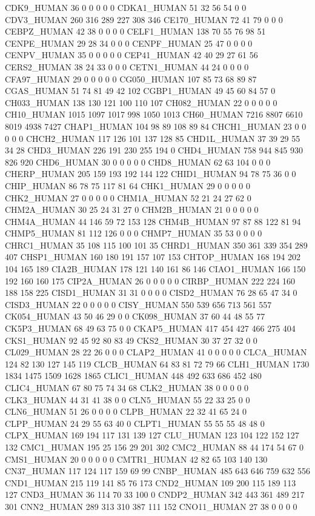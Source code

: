 CDK9_HUMAN	36	0	0	0	0	0
CDKA1_HUMAN	51	32	56	54	0	0
CDV3_HUMAN	260	316	289	227	308	346
CE170_HUMAN	72	41	79	0	0	0
CEBPZ_HUMAN	42	38	0	0	0	0
CELF1_HUMAN	138	70	55	76	98	51
CENPE_HUMAN	29	28	34	0	0	0
CENPF_HUMAN	25	47	0	0	0	0
CENPV_HUMAN	35	0	0	0	0	0
CEP41_HUMAN	42	40	29	27	61	56
CERS2_HUMAN	38	24	33	0	0	0
CETN1_HUMAN	44	24	0	0	0	0
CFA97_HUMAN	29	0	0	0	0	0
CG050_HUMAN	107	85	73	68	89	87
CGAS_HUMAN	51	74	81	49	42	102
CGBP1_HUMAN	49	45	60	84	57	0
CH033_HUMAN	138	130	121	100	110	107
CH082_HUMAN	22	0	0	0	0	0
CH10_HUMAN	1015	1097	1017	998	1050	1013
CH60_HUMAN	7216	8807	6610	8019	4938	7427
CHAP1_HUMAN	104	98	89	108	89	84
CHCH1_HUMAN	23	0	0	0	0	0
CHCH2_HUMAN	117	126	101	137	128	85
CHD1L_HUMAN	37	39	29	55	34	28
CHD3_HUMAN	226	191	230	255	194	0
CHD4_HUMAN	758	944	845	930	826	920
CHD6_HUMAN	30	0	0	0	0	0
CHD8_HUMAN	62	63	104	0	0	0
CHERP_HUMAN	205	159	193	192	144	122
CHID1_HUMAN	94	78	75	36	0	0
CHIP_HUMAN	86	78	75	117	81	64
CHK1_HUMAN	29	0	0	0	0	0
CHK2_HUMAN	27	0	0	0	0	0
CHM1A_HUMAN	52	21	24	27	62	0
CHM2A_HUMAN	30	25	24	31	27	0
CHM2B_HUMAN	21	0	0	0	0	0
CHM4A_HUMAN	44	146	59	72	153	128
CHM4B_HUMAN	97	87	88	122	81	94
CHMP5_HUMAN	81	112	126	0	0	0
CHMP7_HUMAN	35	53	0	0	0	0
CHRC1_HUMAN	35	108	115	100	101	35
CHRD1_HUMAN	350	361	339	354	289	407
CHSP1_HUMAN	160	180	191	157	107	153
CHTOP_HUMAN	168	194	202	104	165	189
CIA2B_HUMAN	178	121	140	161	86	146
CIAO1_HUMAN	166	150	192	160	160	175
CIP2A_HUMAN	26	0	0	0	0	0
CIRBP_HUMAN	222	224	160	188	158	225
CISD1_HUMAN	31	31	0	0	0	0
CISD2_HUMAN	76	28	65	47	34	0
CISD3_HUMAN	22	0	0	0	0	0
CISY_HUMAN	550	539	656	713	561	557
CK054_HUMAN	43	50	46	29	0	0
CK098_HUMAN	37	60	44	48	55	77
CK5P3_HUMAN	68	49	63	75	0	0
CKAP5_HUMAN	417	454	427	466	275	404
CKS1_HUMAN	92	45	92	80	83	49
CKS2_HUMAN	30	37	27	32	0	0
CL029_HUMAN	28	22	26	0	0	0
CLAP2_HUMAN	41	0	0	0	0	0
CLCA_HUMAN	124	82	130	127	145	119
CLCB_HUMAN	64	83	81	72	79	66
CLH1_HUMAN	1730	1834	1475	1509	1628	1865
CLIC1_HUMAN	448	492	633	686	452	480
CLIC4_HUMAN	67	80	75	74	34	68
CLK2_HUMAN	38	0	0	0	0	0
CLK3_HUMAN	44	31	41	38	0	0
CLN5_HUMAN	55	22	33	25	0	0
CLN6_HUMAN	51	26	0	0	0	0
CLPB_HUMAN	22	32	41	65	24	0
CLPP_HUMAN	24	29	55	63	40	0
CLPT1_HUMAN	55	55	55	48	48	0
CLPX_HUMAN	169	194	117	131	139	127
CLU_HUMAN	123	104	122	152	127	132
CMC1_HUMAN	195	25	156	29	201	302
CMC2_HUMAN	88	44	174	54	67	0
CMS1_HUMAN	20	0	0	0	0	0
CMTR1_HUMAN	42	82	65	103	140	130
CN37_HUMAN	117	124	117	159	69	99
CNBP_HUMAN	485	643	646	759	632	556
CND1_HUMAN	215	119	141	85	76	173
CND2_HUMAN	109	200	115	189	113	127
CND3_HUMAN	36	114	70	33	100	0
CNDP2_HUMAN	342	443	361	489	217	301
CNN2_HUMAN	289	313	310	387	111	152
CNO11_HUMAN	27	38	0	0	0	0
